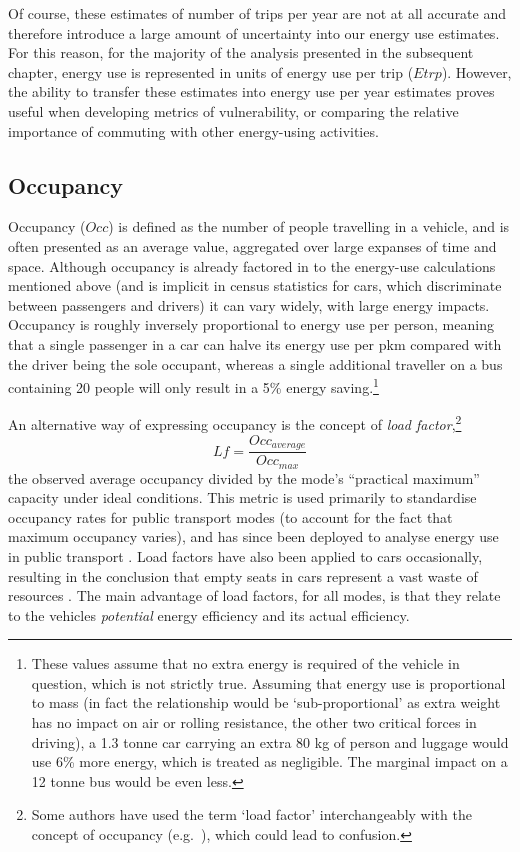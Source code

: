 \documentclass[a4paper, 11pt, twoside]{Thesis}
\begin{document}
Of course, these estimates of number of trips per year are not at all
accurate and therefore introduce a large amount of uncertainty into our
energy use estimates. For this reason, for the majority of the analysis
presented in the subsequent chapter, energy use is represented in units of
energy use per trip ($Etrp$). However, the ability to transfer these
estimates into energy use per year estimates proves useful when developing
metrics of vulnerability, or comparing the relative importance of
commuting with other energy-using activities. 

\subsection{Occupancy}
Occupancy ($Occ$) is defined as the number of people travelling in a vehicle, and
is often presented as an average value, aggregated over large expanses of time
and space. Although occupancy is already factored in to the energy-use
calculations mentioned above (and is implicit in census statistics for cars,
which discriminate between passengers and drivers) it can vary widely, with
large energy impacts.
Occupancy is roughly inversely proportional to energy use per person,
meaning that a single passenger in a car can halve its energy use per pkm
compared with the driver being the sole occupant, whereas a single additional
traveller on a bus containing 20 people will only result in a 5\% energy
saving.\footnote{These values
assume that no extra energy is required of the vehicle in question,
which is not strictly true. Assuming that energy use is proportional to
mass (in fact the relationship would be `sub-proportional' as extra weight
has no impact on air or rolling resistance, the other two critical forces
in driving), a 1.3 tonne car carrying an extra 80 kg of person and luggage would
use 6\% more energy, which is treated as negligible. The marginal
impact on a 12 tonne bus would be even less.
}

An alternative way of expressing occupancy is the concept of
\emph{load factor},\footnote{Some
authors have used the term `load factor' interchangeably with the concept
of occupancy (e.g.~\citealp{Jennings2013}), which could lead to confusion.}
\begin{equation}
 Lf = \frac{Occ_{average}}{Occ_{max}}
\end{equation}
the observed average occupancy divided by the mode's ``practical maximum''
\citep[p.~562]{Jackson1975} capacity under ideal conditions.
This metric is used primarily to standardise occupancy rates for public
transport modes (to account for the fact that maximum occupancy varies),
and has since been deployed to analyse energy use in public transport
\citep{Pisarski1975, Schafer1999}. Load factors have also been applied to
cars occasionally, resulting in the conclusion that empty seats
in cars represent a vast waste of resources \citep{Jackson1975}.
The main advantage of load factors, for all modes, is that they relate to the
vehicles \emph{potential} energy efficiency and its actual efficiency.
\end{document}
